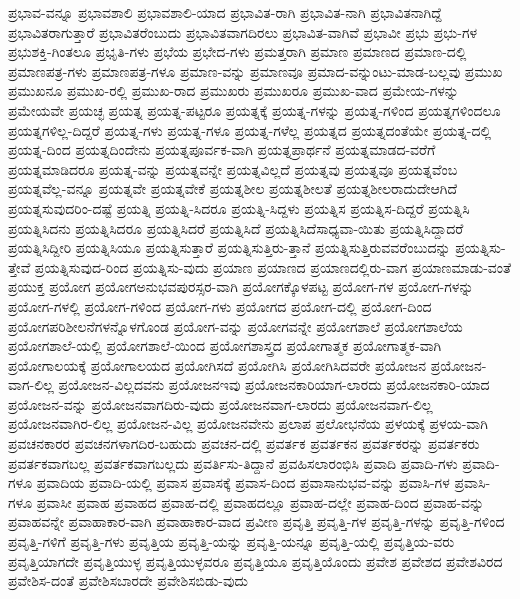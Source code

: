 {ಪ್ರಭಾವ-ವನ್ನೂ
ಪ್ರಭಾವಶಾಲಿ
ಪ್ರಭಾವಶಾಲಿ-ಯಾದ
ಪ್ರಭಾವಿತ-ರಾಗಿ
ಪ್ರಭಾವಿತ-ನಾಗಿ
ಪ್ರಭಾವಿತನಾಗಿದ್ದೆ
ಪ್ರಭಾವಿತರಾಗುತ್ತಾರೆ
ಪ್ರಭಾವಿತರೆಂಬುದು
ಪ್ರಭಾವಿತವಾಗದಿರಲು
ಪ್ರಭಾವಿತ-ವಾಗಿವೆ
ಪ್ರಭಾವೀ
ಪ್ರಭು
ಪ್ರಭು-ಗಳ
ಪ್ರಭುಶಕ್ತಿ-ಗಿಂತಲೂ
ಪ್ರಭೃತಿ-ಗಳು
ಪ್ರಭೆಯ
ಪ್ರಭೇದ-ಗಳು
ಪ್ರಮತ್ತರಾಗಿ
ಪ್ರಮಾಣ
ಪ್ರಮಾಣದ
ಪ್ರಮಾಣ-ದಲ್ಲಿ
ಪ್ರಮಾಣಪತ್ರ-ಗಳು
ಪ್ರಮಾಣಪತ್ರ-ಗಳೂ
ಪ್ರಮಾಣ-ವನ್ನು
ಪ್ರಮಾಣವೂ
ಪ್ರಮಾದ-ವನ್ನುಂಟು-ಮಾಡ-ಬಲ್ಲವು
ಪ್ರಮುಖ
ಪ್ರಮುಖನೂ
ಪ್ರಮುಖ-ರಲ್ಲಿ
ಪ್ರಮುಖ-ರಾದ
ಪ್ರಮುಖರು
ಪ್ರಮುಖರೂ
ಪ್ರಮುಖ-ವಾದ
ಪ್ರಮೇಯ-ಗಳನ್ನು
ಪ್ರಮೇಯವೇ
ಪ್ರಯಚ್ಛ
ಪ್ರಯತ್ನ
ಪ್ರಯತ್ನ-ಪಟ್ಟರೂ
ಪ್ರಯತ್ನಕ್ಕೆ
ಪ್ರಯತ್ನ-ಗಳನ್ನು
ಪ್ರಯತ್ನ-ಗಳಿಂದ
ಪ್ರಯತ್ನಗಳಿಂದಲೂ
ಪ್ರಯತ್ನಗಳಿಲ್ಲ-ದಿದ್ದರೆ
ಪ್ರಯತ್ನ-ಗಳು
ಪ್ರಯತ್ನ-ಗಳೂ
ಪ್ರಯತ್ನ-ಗಳೆಲ್ಲ
ಪ್ರಯತ್ನದ
ಪ್ರಯತ್ನದಂತೆಯೇ
ಪ್ರಯತ್ನ-ದಲ್ಲಿ
ಪ್ರಯತ್ನ-ದಿಂದ
ಪ್ರಯತ್ನದಿಂದೇನು
ಪ್ರಯತ್ನಪೂರ್ವಕ-ವಾಗಿ
ಪ್ರಯತ್ನಪ್ರಾರ್ಥನೆ
ಪ್ರಯತ್ನಮಾಡದ-ವರೆಗೆ
ಪ್ರಯತ್ನಮಾಡಿದರೂ
ಪ್ರಯತ್ನ-ವನ್ನು
ಪ್ರಯತ್ನವನ್ನೇ
ಪ್ರಯತ್ನವಿಲ್ಲದೆ
ಪ್ರಯತ್ನವು
ಪ್ರಯತ್ನವೂ
ಪ್ರಯತ್ನವೆಂಬ
ಪ್ರಯತ್ನವೆಲ್ಲ-ವನ್ನೂ
ಪ್ರಯತ್ನವೇ
ಪ್ರಯತ್ನವೇಕೆ
ಪ್ರಯತ್ನಶೀಲ
ಪ್ರಯತ್ನಶೀಲತೆ
ಪ್ರಯತ್ನಶೀಲರಾದುದೇಆಗಿದೆ
ಪ್ರಯತ್ನಸುವುದರಿಂ-ದಷ್ಟೆ
ಪ್ರಯತ್ನಿ
ಪ್ರಯತ್ನಿ-ಸಿದರೂ
ಪ್ರಯತ್ನಿ-ಸಿದ್ದಳು
ಪ್ರಯತ್ನಿಸ
ಪ್ರಯತ್ನಿಸ-ದಿದ್ದರೆ
ಪ್ರಯತ್ನಿಸಿ
ಪ್ರಯತ್ನಿಸಿದನು
ಪ್ರಯತ್ನಿಸಿದರೂ
ಪ್ರಯತ್ನಿಸಿದರೆ
ಪ್ರಯತ್ನಿಸಿದೆ
ಪ್ರಯತ್ನಿಸಿದೆಸಾಧ್ಯವಾ-ಯಿತು
ಪ್ರಯತ್ನಿಸಿದ್ದಾದರೆ
ಪ್ರಯತ್ನಿಸಿದ್ದೀರಿ
ಪ್ರಯತ್ನಿಸಿಯೂ
ಪ್ರಯತ್ನಿಸುತ್ತಾರೆ
ಪ್ರಯತ್ನಿಸುತ್ತಿರು-ತ್ತಾನೆ
ಪ್ರಯತ್ನಿಸುತ್ತಿರುವವರೆಂಬುದನ್ನು
ಪ್ರಯತ್ನಿಸು-ತ್ತೇವೆ
ಪ್ರಯತ್ನಿಸುವುದ-ರಿಂದ
ಪ್ರಯತ್ನಿಸು-ವುದು
ಪ್ರಯಾಣ
ಪ್ರಯಾಣದ
ಪ್ರಯಾಣದಲ್ಲಿರು-ವಾಗ
ಪ್ರಯಾಣಮಾಡು-ವಂತೆ
ಪ್ರಯುಕ್ತ
ಪ್ರಯೋಗ
ಪ್ರಯೋಗಅನುಭವಪುರಸ್ಸರ-ವಾಗಿ
ಪ್ರಯೋಗಕ್ಕೊಳಪಟ್ಟ
ಪ್ರಯೋಗ-ಗಳ
ಪ್ರಯೋಗ-ಗಳನ್ನು
ಪ್ರಯೋಗ-ಗಳಲ್ಲಿ
ಪ್ರಯೋಗ-ಗಳಿಂದ
ಪ್ರಯೋಗ-ಗಳು
ಪ್ರಯೋಗದ
ಪ್ರಯೋಗ-ದಲ್ಲಿ
ಪ್ರಯೋಗ-ದಿಂದ
ಪ್ರಯೋಗಪರಿಶೀಲನೆಗಳನ್ನೊಳಗೊಂಡ
ಪ್ರಯೋಗ-ವನ್ನು
ಪ್ರಯೋಗವನ್ನೇ
ಪ್ರಯೋಗಶಾಲೆ
ಪ್ರಯೋಗಶಾಲೆಯ
ಪ್ರಯೋಗಶಾಲೆ-ಯಲ್ಲಿ
ಪ್ರಯೋಗಶಾಲೆ-ಯಿಂದ
ಪ್ರಯೋಗಶಾಸ್ತ್ರದ
ಪ್ರಯೋಗಾತ್ಮಕ
ಪ್ರಯೋಗಾತ್ಮಕ-ವಾಗಿ
ಪ್ರಯೋಗಾಲಯಕ್ಕೆ
ಪ್ರಯೋಗಾಲಯದ
ಪ್ರಯೋಗಿಸದೆ
ಪ್ರಯೋಗಿಸಿ
ಪ್ರಯೋಗಿಸಿದವರೇ
ಪ್ರಯೋಜನ
ಪ್ರಯೋಜನ-ವಾಗ-ಲಿಲ್ಲ
ಪ್ರಯೋಜನ-ವಿಲ್ಲದವನು
ಪ್ರಯೋಜನಇವು
ಪ್ರಯೋಜನಕಾರಿಯಾಗ-ಲಾರದು
ಪ್ರಯೋಜನಕಾರಿ-ಯಾದ
ಪ್ರಯೋಜನ-ವನ್ನು
ಪ್ರಯೋಜನವಾಗದಿರು-ವುದು
ಪ್ರಯೋಜನವಾಗ-ಲಾರದು
ಪ್ರಯೋಜನವಾಗ-ಲಿಲ್ಲ
ಪ್ರಯೋಜನವಾಗಿರ-ಲಿಲ್ಲ
ಪ್ರಯೋಜನ-ವಿಲ್ಲ
ಪ್ರಯೋಜನವೇನು
ಪ್ರಲಾಪ
ಪ್ರಲೋಭನೆಯ
ಪ್ರಳಯಕ್ಕೆ
ಪ್ರಳಯ-ವಾಗಿ
ಪ್ರವಚನಕಾರರ
ಪ್ರವಚನಗಳಾಗದಿರ-ಬಹುದು
ಪ್ರವಚನ-ದಲ್ಲಿ
ಪ್ರವರ್ತಕ
ಪ್ರವರ್ತಕನ
ಪ್ರವರ್ತಕರನ್ನು
ಪ್ರವರ್ತಕರು
ಪ್ರವರ್ತಕವಾಗಬಲ್ಲ
ಪ್ರವರ್ತಕವಾಗಬಲ್ಲದು
ಪ್ರವರ್ತಿಸು-ತಿದ್ದಾನೆ
ಪ್ರವಹಿಸಲಾರಂಭಿಸಿ
ಪ್ರವಾದಿ
ಪ್ರವಾದಿ-ಗಳು
ಪ್ರವಾದಿ-ಗಳೂ
ಪ್ರವಾದಿಯ
ಪ್ರವಾದಿ-ಯಲ್ಲಿ
ಪ್ರವಾಸ
ಪ್ರವಾಸಕ್ಕೆ
ಪ್ರವಾಸ-ದಿಂದ
ಪ್ರವಾಸಾನುಭವ-ವನ್ನು
ಪ್ರವಾಸಿ-ಗಳ
ಪ್ರವಾಸಿ-ಗಳೂ
ಪ್ರವಾಸೀ
ಪ್ರವಾಹ
ಪ್ರವಾಹದ
ಪ್ರವಾಹ-ದಲ್ಲಿ
ಪ್ರವಾಹದಲ್ಲೂ
ಪ್ರವಾಹ-ದಲ್ಲೇ
ಪ್ರವಾಹ-ದಿಂದ
ಪ್ರವಾಹ-ವನ್ನು
ಪ್ರವಾಹವನ್ನೇ
ಪ್ರವಾಹಾಕಾರ-ವಾಗಿ
ಪ್ರವಾಹಾಕಾರ-ವಾದ
ಪ್ರವೀಣ
ಪ್ರವೃತ್ತಿ
ಪ್ರವೃತ್ತಿ-ಗಳ
ಪ್ರವೃತ್ತಿ-ಗಳನ್ನು
ಪ್ರವೃತ್ತಿ-ಗಳಿಂದ
ಪ್ರವೃತ್ತಿ-ಗಳಿಗೆ
ಪ್ರವೃತ್ತಿ-ಗಳು
ಪ್ರವೃತ್ತಿಯ
ಪ್ರವೃತ್ತಿ-ಯನ್ನು
ಪ್ರವೃತ್ತಿ-ಯನ್ನೂ
ಪ್ರವೃತ್ತಿ-ಯಲ್ಲಿ
ಪ್ರವೃತ್ತಿಯ-ವರು
ಪ್ರವೃತ್ತಿಯಾಗದೇ
ಪ್ರವೃತ್ತಿಯುಳ್ಳ
ಪ್ರವೃತ್ತಿಯುಳ್ಳವರೂ
ಪ್ರವೃತ್ತಿಯೂ
ಪ್ರವೃತ್ತಿಯೊಂದು
ಪ್ರವೇಶ
ಪ್ರವೇಶದ
ಪ್ರವೇಶವಿರದ
ಪ್ರವೇಶಿಸ-ದಂತೆ
ಪ್ರವೇಶಿಸಬಾರದೇ
ಪ್ರವೇಶಿಸಬಿಡು-ವುದು
}
